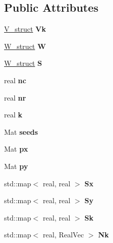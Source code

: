 \subsection*{Public Attributes}
\begin{DoxyCompactItemize}
\item 
\mbox{\label{classvd_aca8bd9fa239b6fadf3b3a25e5c17557e}} 
\mbox{\hyperlink{structV__struct}{V\+\_\+struct}} {\bfseries Vk}
\item 
\mbox{\label{classvd_ab23d33e6c11c46ad3302a874a4726542}} 
\mbox{\hyperlink{structW__struct}{W\+\_\+struct}} {\bfseries W}
\item 
\mbox{\label{classvd_a960c80ec5b52938f999f528a5e3cccf1}} 
\mbox{\hyperlink{structW__struct}{W\+\_\+struct}} {\bfseries S}
\item 
\mbox{\label{classvd_a989a61c00de8a517c1093aba6f7d1b22}} 
real {\bfseries nc}
\item 
\mbox{\label{classvd_a04271075413d6082dad757da678d0181}} 
real {\bfseries nr}
\item 
\mbox{\label{classvd_a0cbfe9c7ca1e17901cc232d57352f200}} 
real {\bfseries k}
\item 
\mbox{\label{classvd_aebb5bd18cba152453d0c74134c233d0e}} 
Mat {\bfseries seeds}
\item 
\mbox{\label{classvd_afc15550440d0c6bc61d917f4ac75aa75}} 
Mat {\bfseries px}
\item 
\mbox{\label{classvd_a71b266194d117645ce8a3aeee98499f9}} 
Mat {\bfseries py}
\item 
\mbox{\label{classvd_a2c1599932c0909f80abd6cf7601940f6}} 
std\+::map$<$ real, real $>$ {\bfseries Sx}
\item 
\mbox{\label{classvd_abfa4f5d8305394eed7e36fabbb65e782}} 
std\+::map$<$ real, real $>$ {\bfseries Sy}
\item 
\mbox{\label{classvd_a8b0e7202fac9d8411a0b3d1e6960bf5e}} 
std\+::map$<$ real, real $>$ {\bfseries Sk}
\item 
\mbox{\label{classvd_a417f0bd0c1c54c7d927352df356134b6}} 
std\+::map$<$ real, Real\+Vec $>$ {\bfseries Nk}
\end{DoxyCompactItemize}


